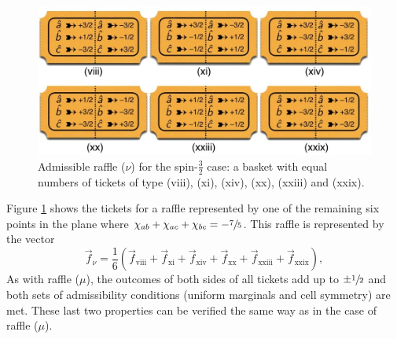 
\begin{figure}[ht]
 \centering
   \includegraphics[width=4.5in]{raffles-spin32-tickets-nu.jpeg} 
   \caption{Admissible raffle ($\nu$) for the spin-$\frac32$ case: a basket with equal numbers of tickets of type (viii), (xi), (xiv), (xx), (xxiii) and (xxix).}
    \label{raffles-spin32-tickets-nu}
\end{figure}

Figure \ref{raffles-spin32-tickets-nu} shows the tickets for a raffle represented by one of the remaining six points in the plane where $\chi_{ab} + \chi_{ac} + \chi_{bc} = -\sfrac75$. This raffle is represented by the vector 
\begin{equation}
\vec{f}_\nu =  \frac16 \left( \vec{f}_{\mathrm{viii}} + \vec{f}_{\mathrm{xi}} + \vec{f}_{\mathrm{xiv}} + \vec{f}_{\mathrm{xx}} + \vec{f}_{\mathrm{xxiii}} + \vec{f}_{\mathrm{xxix}} \right),
\label{vec spin 32 raffle nu}
\end{equation}
As with raffle ($\mu$), the outcomes of both sides of all tickets add up to $\pm \sfrac12$ and both sets of admissibility conditions (uniform marginals and cell symmetry) are met. These last two properties can be verified the same way as in the case of raffle ($\mu$). 

